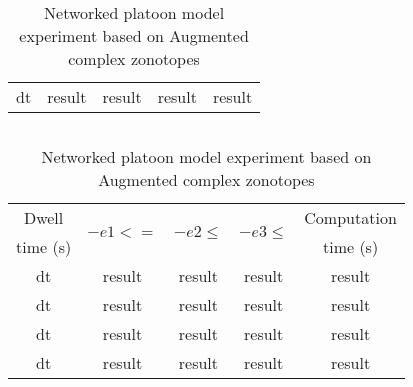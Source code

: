 \begin{table}
\begin{minipage}{0.45\textwidth}
\begin{tabular}{|c|c|c|c|c|}
\hline
\multirow{2}{*}{dt} & \multirow{2}{*}{result} &
\multirow{2}{*}{result} & \multirow{2}{*}{result} &
\multirow{2}{*}{result} \\
& & & & \\
\hline
\end{tabular}
\caption{Networked platoon model experiment in SpaceEx with 100 support
  vectors}
\end{minipage}
$~$\\
$~$\\
\centering
\begin{tabular}{|c|c|c|c|c|}
\hline
Dwell & \multirow{2}{*}{$-e1<=$} & \multirow{2}{*}{$-e2\leq$} &
\multirow{2}{*}{$-e3\leq$} & Computation\\
time (s) & & & & time (s)\\
\hline
\multirow{2}{*}{dt} & \multirow{2}{*}{result} &
\multirow{2}{*}{result} & \multirow{2}{*}{result} &
\multirow{2}{*}{result} \\
& & & & \\
\hline
\multirow{2}{*}{dt} & \multirow{2}{*}{result} &
\multirow{2}{*}{result} & \multirow{2}{*}{result} &
\multirow{2}{*}{result} \\
& & & & \\
\hline
\multirow{2}{*}{dt} & \multirow{2}{*}{result} &
\multirow{2}{*}{result} & \multirow{2}{*}{result} &
\multirow{2}{*}{result} \\
& & & & \\
\hline
\multirow{2}{*}{dt} & \multirow{2}{*}{result} &
\multirow{2}{*}{result} & \multirow{2}{*}{result} &
\multirow{2}{*}{result} \\
& & & & \\
\hline
\end{tabular}
\caption{Networked platoon model experiment based on Augmented complex zonotopes}
\end{table}



